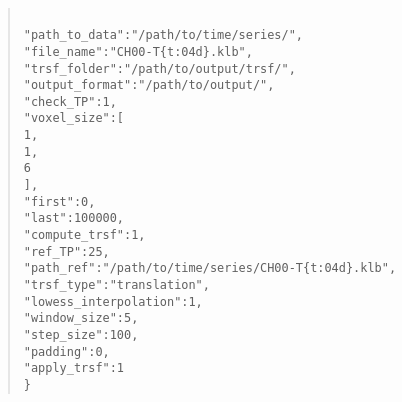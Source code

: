 \documentclass[10pt,a4paper]{book}
\newcommand\tab[1][.6cm]{\hspace*{#1}}
\newenvironment{code}[1]{\mbox{}\\[1ex]\hspace*{-#1cm}\begin{minipage}{150mm}\begin{quote}\tt}{\end{quote}\end{minipage}\mbox{}\\[1ex]}
\begin{document}
\begin{code}{0.8}
\{\\
\tab"path\_to\_data":"/path/to/time/series/",\\
\tab"file\_name":"CH00-T\{t:04d\}.klb",\\
\tab"trsf\_folder":"/path/to/output/trsf/",\\
\tab"output\_format":"/path/to/output/",\\
\tab"check\_TP":1,\\
\tab"voxel\_size":[\\
\tab\tab1,\\
\tab\tab1,\\
\tab\tab6\\
\tab],\\
\tab"first":0,\\
\tab"last":100000,\\
\tab"compute\_trsf":1,\\
\tab"ref\_TP":25,\\
\tab"path\_ref":"/path/to/time/series/CH00-T\{t:04d\}.klb",\\
\tab"trsf\_type":"translation",\\
\tab"lowess\_interpolation":1,\\
\tab"window\_size":5,\\
\tab"step\_size":100,\\
\tab"padding":0,\\
\tab"apply\_trsf":1\\
\}
\end{code}
\end{document}
